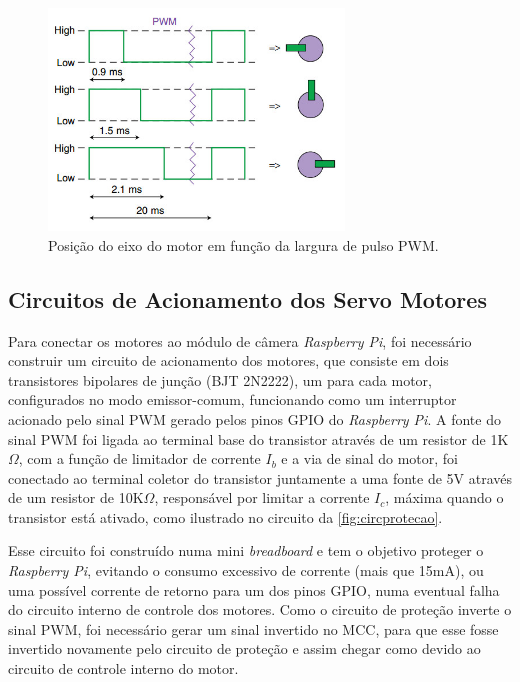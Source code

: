 \begin{figure}[H]
	\centering
	\includegraphics[width=0.7\textwidth]{figuras/pwm_servo.jpg}
	\caption{Posição do eixo do motor em função da largura de pulso PWM.}
	\label{fig:pwmservo}
\end{figure}

\subsection{Circuitos de Acionamento dos Servo Motores}
\label{subsec:servomotorcircacionamento}

Para conectar os motores ao módulo de câmera \textit{Raspberry Pi}, foi necessário construir um circuito de acionamento dos motores, que consiste em dois transistores bipolares de junção (BJT 2N2222), um para cada motor, configurados no modo emissor-comum, funcionando como um interruptor acionado pelo sinal PWM gerado pelos pinos GPIO do \textit{Raspberry Pi}. A fonte do sinal PWM foi ligada ao terminal base do transistor através de um resistor de 1K$\Omega$, com a função de limitador de corrente $I_b$ e a via de sinal do motor, foi conectado ao terminal coletor do transistor juntamente a uma fonte de 5V através de um resistor de 10K$\Omega$, responsável por limitar a corrente $I_c$, máxima quando o transistor está ativado, como ilustrado no circuito da \autoref{fig:circprotecao}.\par

Esse circuito foi construído numa mini \textit{breadboard} e tem o objetivo proteger o \textit{Raspberry Pi}, evitando o consumo excessivo de corrente (mais que 15mA), ou uma possível corrente de retorno para um dos pinos GPIO, numa eventual falha do circuito interno de controle dos motores. Como o circuito de proteção inverte o sinal PWM, foi necessário gerar um sinal invertido no MCC, para que esse fosse invertido novamente pelo circuito de proteção e assim chegar como devido ao circuito de controle interno do motor.\par

